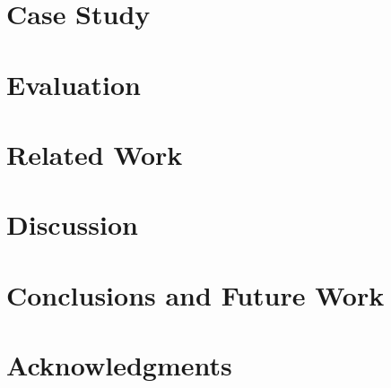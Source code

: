 \section{Case Study}\label{sec:case_study}
	\linespread{0.87}
	

%
\section{Evaluation}\label{sec:evaluation}
	\linespread{0.87}
	

\section{Related Work}\label{sec:related_work}
		\linespread{0.87}
		

\section{Discussion}\label{sec:a_brief_discussion}		
	\linespread{0.87}
	

\section{Conclusions and Future Work}\label{sec:conclusion}
		\linespread{0.87}
		

\section*{Acknowledgments}
	\linespread{0.87}
	


